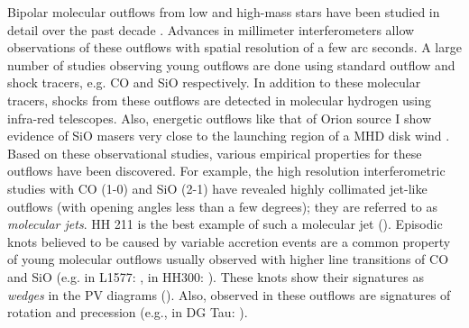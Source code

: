 \documentclass[useAMS,usenatbib]{mn2e}
\begin{document}
Bipolar molecular outflows from low and high-mass stars
have been studied in detail over the past 
decade \citep[see reviews by][]{Bachiller:1996p4692, Beuther:2002p1149, Arce:2007p798,
Tafalla:2011p14051}. Advances in millimeter interferometers 
allow observations of these outflows with spatial resolution of a
few arc seconds. A large number of studies observing young
outflows are done using standard outflow and shock tracers,
e.g. CO and SiO respectively. In addition to these molecular tracers,
shocks from these outflows are detected in molecular hydrogen using
infra-red telescopes. Also, energetic outflows like that of
Orion source I show evidence of SiO masers very close to the launching
region of a MHD disk wind \citep{Goddi:2009p8571, Vaidya:2013p12777}. 
Based on these observational studies, various
empirical properties for these outflows have been discovered. 
For example, the high resolution interferometric studies with
CO (1-0) and SiO (2-1) have revealed highly collimated jet-like
outflows (with opening angles less than a few degrees); they are
referred to as {\em{molecular jets}}. HH 211 is the best example of
such a molecular jet (\citealt{Gueth:1999p4683}).
Episodic knots believed to be caused by variable accretion events are a common property
of young molecular outflows usually observed with higher line
transitions of CO and SiO (e.g. in L1577:
\citealt{Gueth:1998p14058}, in HH300: \citealt{Arce:2001p14064}). These knots show their signatures
as {\em{wedges}} in the PV diagrams (\citealt{Arce:2001p14065}). Also, 
observed in these outflows are signatures of rotation and
precession (e.g., in DG Tau: \citealt{Bacciotti:2002p2084}).
%
\end{document}
